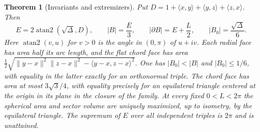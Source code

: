 \documentclass[11pt,reqno]{amsart}
\newtheorem{theorem}{Theorem}[section]
\theoremstyle{definition}
\theoremstyle{remark}
\numberwithin{equation}{section}
\begin{document}
\begin{theorem}[Invariants and extremizers]\label{m8:invariants}
Put $D=1+\langle x,y\rangle+\langle y,z\rangle+\langle z,x\rangle$.
Then
\[
 E=2\operatorname{atan2}(\sqrt{\Delta},D),\qquad
 |B|=\frac E3,\qquad |\partial B|=E+\frac L2,\qquad
 |B_0|=\frac{\sqrt{\Delta}}6 .
\]
Here $\operatorname{atan2}(v,u)$ for $v>0$ is the angle in $(0,\pi)$
of $u+iv$. Each radial face has area half its arc length, and the flat
chord face has area
$\tfrac12\sqrt{\|y-x\|^2\|z-x\|^2-\langle y-x,z-x\rangle^2}$.
One has $|B_0|<|B|$ and $|B_0|\le1/6$, with equality in the latter
exactly for an orthonormal triple. The chord face has area at most
$3\sqrt3/4$, with equality precisely for an equilateral triangle
centered at the origin in its plane in the closure of the family.
At every fixed $0<L<2\pi$ the spherical area and sector volume are
uniquely maximized, up to isometry, by the equilateral triangle.
The supremum of $E$ over all independent triples is $2\pi$ and is
unattained.
\end{theorem}
\end{document}
